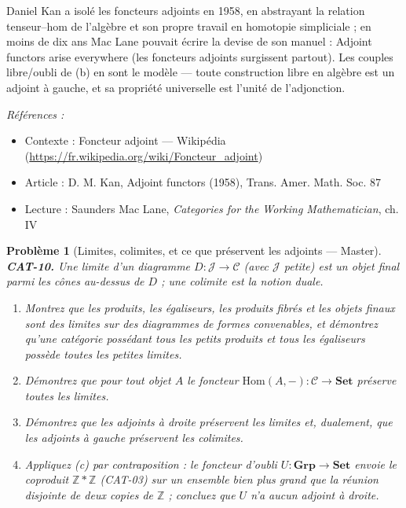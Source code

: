 \documentclass[11pt]{article}
\newtheorem{problem}{Problème}
\newenvironment{refs}{\par\small\noindent\emph{Références :}\begin{itemize}\setlength\itemsep{0pt}}{\end{itemize}\normalsize}
\begin{document}
\noindent Daniel Kan a isolé les foncteurs adjoints en 1958, en abstrayant la relation
tenseur--hom de l'algèbre et son propre travail en homotopie simpliciale ; en moins de dix ans Mac
Lane pouvait écrire la devise de son manuel : \og{} Adjoint functors arise everywhere \fg{} (les foncteurs
adjoints surgissent partout). Les couples libre/oubli de (b) en sont le modèle --- toute
construction \og{} libre \fg{} en algèbre est un adjoint à gauche, et sa propriété universelle est l'unité
de l'adjonction.

\begin{refs}
\item Contexte : Foncteur adjoint --- Wikipédia (\url{https://fr.wikipedia.org/wiki/Foncteur_adjoint})
\item Article : D. M. Kan, \og{} Adjoint functors \fg{} (1958), Trans. Amer. Math. Soc. 87
\item Lecture : Saunders Mac Lane, \textit{Categories for the Working Mathematician}, ch. IV
\end{refs}

\bigskip

\begin{problem}[{Limites, colimites, et ce que préservent les adjoints --- Master}]
\textbf{CAT-10.} Une \textit{limite} d'un diagramme $ D\colon \mathcal{J} \to
\mathcal{C} $ (avec $ \mathcal{J} $ petite) est un objet final parmi les cônes au-dessus de
$ D $ ; une \textit{colimite} est la notion duale.
\begin{enumerate}
\item[(a)] Montrez que les produits, les égaliseurs, les produits fibrés et les objets finaux sont des
limites sur des diagrammes de formes convenables, et démontrez qu'une catégorie possédant tous les
petits produits et tous les égaliseurs possède toutes les petites limites.
\item[(b)] Démontrez que pour tout objet $ A $ le
foncteur $ \mathrm{Hom}(A, -)\colon \mathcal{C} \to \mathbf{Set} $ préserve toutes les limites.
\item[(c)] Démontrez que les adjoints à droite préservent les limites et, dualement, que les adjoints à
gauche préservent les colimites.
\item[(d)] Appliquez (c) par contraposition : le foncteur d'oubli $ U\colon \mathbf{Grp} \to
\mathbf{Set} $ envoie le coproduit $ \mathbb{Z} * \mathbb{Z} $ (CAT-03) sur un ensemble bien
plus grand que la réunion disjointe de deux copies de $ \mathbb{Z} $ ; concluez que $ U $ n'a
aucun adjoint à droite.
\end{enumerate}

\end{problem}
\end{document}
